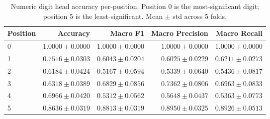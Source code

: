 \begin{table}[h]
\centering
\caption{Numeric digit head accuracy per-position. Position 0 is the most-significant digit; position 5 is the least-significant. Mean $\pm$ std across 5 folds.}
\label{tab:per_digit_position}
\begin{tabular}{l r r r r}
\toprule
Position & Accuracy & Macro F1 & Macro Precision & Macro Recall \\
\midrule
0 & $1.0000 \pm 0.0000$ & $1.0000 \pm 0.0000$ & $1.0000 \pm 0.0000$ & $1.0000 \pm 0.0000$ \\
1 & $0.7516 \pm 0.0303$ & $0.6043 \pm 0.0204$ & $0.6025 \pm 0.0229$ & $0.6211 \pm 0.0273$ \\
2 & $0.6184 \pm 0.0424$ & $0.5167 \pm 0.0594$ & $0.5339 \pm 0.0640$ & $0.5436 \pm 0.0817$ \\
3 & $0.6318 \pm 0.0389$ & $0.6829 \pm 0.0856$ & $0.7362 \pm 0.0806$ & $0.6963 \pm 0.0833$ \\
4 & $0.6966 \pm 0.0420$ & $0.5312 \pm 0.0562$ & $0.5648 \pm 0.0437$ & $0.5363 \pm 0.0773$ \\
5 & $0.8636 \pm 0.0319$ & $0.8813 \pm 0.0319$ & $0.8950 \pm 0.0325$ & $0.8926 \pm 0.0513$ \\
\bottomrule
\end{tabular}
\end{table}
